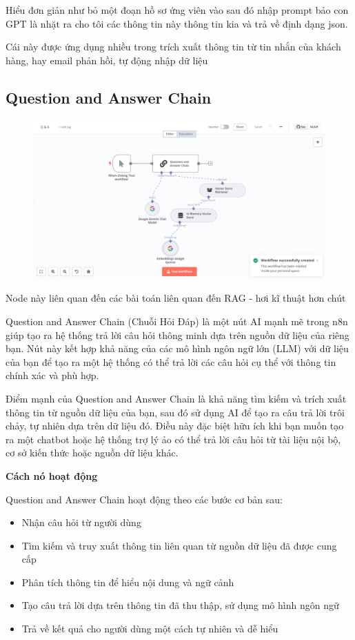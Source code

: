 Hiểu đơn giản như bỏ một đoạn hồ sơ ứng viên vào sau đó nhập prompt bảo con GPT là nhặt ra cho tôi các thông tin này thông tin kia và trả về định dạng json. 

Cái này được ứng dụng nhiều trong trích xuất thông tin từ tin nhắn của khách hàng, hay email phản hồi, tự động nhập dữ liệu 



\newpage
\subsection{Question and Answer Chain}
\begin{figure}[htbp]
    \centering
    \includegraphics[width=1\linewidth]{Chap1-7/Q & A.pdf}
\end{figure}

Node này liên quan đến các bài toán liên quan đến RAG - hơi kĩ thuật hơn chút

Question and Answer Chain (Chuỗi Hỏi Đáp) là một nút AI mạnh mẽ trong n8n giúp tạo ra hệ thống trả lời câu hỏi thông minh dựa trên nguồn dữ liệu của riêng bạn. Nút này kết hợp khả năng của các mô hình ngôn ngữ lớn (LLM) với dữ liệu của bạn để tạo ra một hệ thống có thể trả lời các câu hỏi cụ thể với thông tin chính xác và phù hợp.

Điểm mạnh của Question and Answer Chain là khả năng tìm kiếm và trích xuất thông tin từ nguồn dữ liệu của bạn, sau đó sử dụng AI để tạo ra câu trả lời trôi chảy, tự nhiên dựa trên dữ liệu đó. Điều này đặc biệt hữu ích khi bạn muốn tạo ra một chatbot hoặc hệ thống trợ lý ảo có thể trả lời câu hỏi từ tài liệu nội bộ, cơ sở kiến thức hoặc nguồn dữ liệu khác.

\textbf{Cách nó hoạt động}

Question and Answer Chain hoạt động theo các bước cơ bản sau:
\begin{itemize}
    \item Nhận câu hỏi từ người dùng
    \item Tìm kiếm và truy xuất thông tin liên quan từ nguồn dữ liệu đã được cung cấp
    \item Phân tích thông tin để hiểu nội dung và ngữ cảnh
    \item Tạo câu trả lời dựa trên thông tin đã thu thập, sử dụng mô hình ngôn ngữ
    \item Trả về kết quả cho người dùng một cách tự nhiên và dễ hiểu
\end{itemize}

